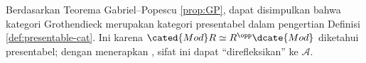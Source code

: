 \begin{remark}
	Berdasarkan Teorema Gabriel--Popescu \ref{prop:GP}, dapat disimpulkan bahwa kategori Grothendieck merupakan kategori presentabel dalam pengertian Definisi \ref{def:presentable-cat}. Ini karena $\cated{Mod}R \simeq R^{\opp}\dcate{Mod}$ diketahui presentabel; dengan menerapkan \cite[Korolari 1.40]{AR94}, sifat ini dapat ``direfleksikan'' ke $\mathcal{A}$.
\end{remark}
